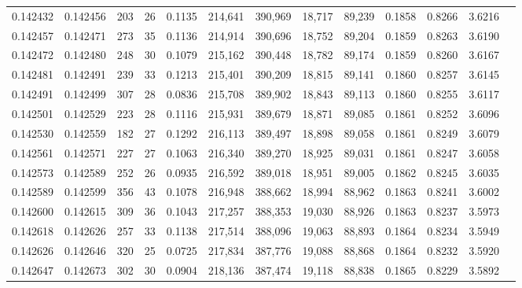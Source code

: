 \begin{tabular}{rrrrrrrrrrrrr}
0.142432 & 0.142456 &   203 &  26 &                                     0.1135 & 214,641 & 390,969 &  18,717 &  89,239 & 0.1858 & 0.8266 & 3.6216 \\
0.142457 & 0.142471 &   273 &  35 &                                     0.1136 & 214,914 & 390,696 &  18,752 &  89,204 & 0.1859 & 0.8263 & 3.6190 \\
0.142472 & 0.142480 &   248 &  30 &                                     0.1079 & 215,162 & 390,448 &  18,782 &  89,174 & 0.1859 & 0.8260 & 3.6167 \\
0.142481 & 0.142491 &   239 &  33 &                                     0.1213 & 215,401 & 390,209 &  18,815 &  89,141 & 0.1860 & 0.8257 & 3.6145 \\
0.142491 & 0.142499 &   307 &  28 &                                     0.0836 & 215,708 & 389,902 &  18,843 &  89,113 & 0.1860 & 0.8255 & 3.6117 \\
0.142501 & 0.142529 &   223 &  28 &                                     0.1116 & 215,931 & 389,679 &  18,871 &  89,085 & 0.1861 & 0.8252 & 3.6096 \\
0.142530 & 0.142559 &   182 &  27 &                                     0.1292 & 216,113 & 389,497 &  18,898 &  89,058 & 0.1861 & 0.8249 & 3.6079 \\
0.142561 & 0.142571 &   227 &  27 &                                     0.1063 & 216,340 & 389,270 &  18,925 &  89,031 & 0.1861 & 0.8247 & 3.6058 \\
0.142573 & 0.142589 &   252 &  26 &                                     0.0935 & 216,592 & 389,018 &  18,951 &  89,005 & 0.1862 & 0.8245 & 3.6035 \\
0.142589 & 0.142599 &   356 &  43 &                                     0.1078 & 216,948 & 388,662 &  18,994 &  88,962 & 0.1863 & 0.8241 & 3.6002 \\
0.142600 & 0.142615 &   309 &  36 &                                     0.1043 & 217,257 & 388,353 &  19,030 &  88,926 & 0.1863 & 0.8237 & 3.5973 \\
0.142618 & 0.142626 &   257 &  33 &                                     0.1138 & 217,514 & 388,096 &  19,063 &  88,893 & 0.1864 & 0.8234 & 3.5949 \\
0.142626 & 0.142646 &   320 &  25 &                                     0.0725 & 217,834 & 387,776 &  19,088 &  88,868 & 0.1864 & 0.8232 & 3.5920 \\
0.142647 & 0.142673 &   302 &  30 &                                     0.0904 & 218,136 & 387,474 &  19,118 &  88,838 & 0.1865 & 0.8229 & 3.5892 \\

\end{tabular}
